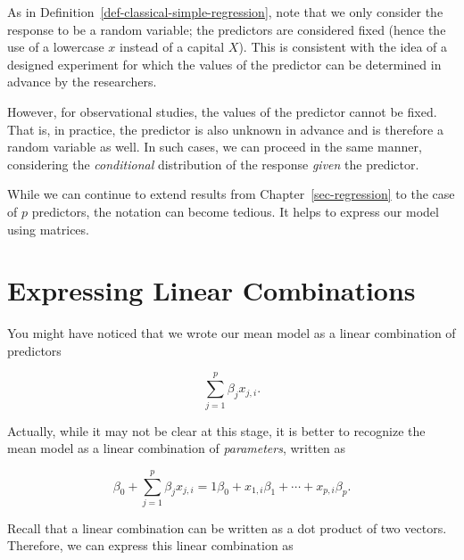 \documentclass[
  letterpaper,
  DIV=11,
  numbers=noendperiod]{scrreprt}
\theoremstyle{definition}
\theoremstyle{plain}
\theoremstyle{definition}
\theoremstyle{remark}
\begin{document}
\begin{tcolorbox}[enhanced jigsaw, breakable, colframe=quarto-callout-note-color-frame, titlerule=0mm, arc=.35mm, coltitle=black, opacitybacktitle=0.6, leftrule=.75mm, opacityback=0, left=2mm, toprule=.15mm, colbacktitle=quarto-callout-note-color!10!white, title=\textcolor{quarto-callout-note-color}{\faInfo}\hspace{0.5em}{Note}, bottomtitle=1mm, toptitle=1mm, rightrule=.15mm, bottomrule=.15mm, colback=white]

As in Definition~\ref{def-classical-simple-regression}, note that we
only consider the response to be a random variable; the predictors are
considered fixed (hence the use of a lowercase \(x\) instead of a
capital \(X\)). This is consistent with the idea of a designed
experiment for which the values of the predictor can be determined in
advance by the researchers.

However, for observational studies, the values of the predictor cannot
be fixed. That is, in practice, the predictor is also unknown in advance
and is therefore a random variable as well. In such cases, we can
proceed in the same manner, considering the \emph{conditional}
distribution of the response \emph{given} the predictor.

\end{tcolorbox}

While we can continue to extend results from
Chapter~\ref{sec-regression} to the case of \(p\) predictors, the
notation can become tedious. It helps to express our model using
matrices.

\section{Expressing Linear
Combinations}\label{expressing-linear-combinations}

You might have noticed that we wrote our mean model as a linear
combination of predictors

\[\sum_{j=1}^{p} \beta_j x_{j,i}.\]

Actually, while it may not be clear at this stage, it is better to
recognize the mean model as a linear combination of \emph{parameters},
written as

\[\beta_0 + \sum_{j=1}^{p} \beta_j x_{j,i} = 1 \beta_0 + x_{1,i} \beta_1 + \dotsb + x_{p,i} \beta_p.\]

Recall that a linear combination can be written as a dot product of two
vectors. Therefore, we can express this linear combination as
\end{document}
